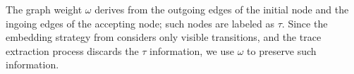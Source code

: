 \begin{table}[!t]
	\caption{Projections of $\tg$ over $\net$-traces of length $4$.}\label{tab:proj}
	\centering
\vspace{-0.2cm}
\end{table}
The graph weight $\omega$ derives from the outgoing edges of the initial node and the ingoing edges of the accepting node; 
such nodes are labeled as $\tau$. Since the embedding strategy from \cite{LodhiSSCW02} considers only visible 
transitions, and the trace extraction process discards the $\tau$ information, we use $\omega$ to preserve such information.
